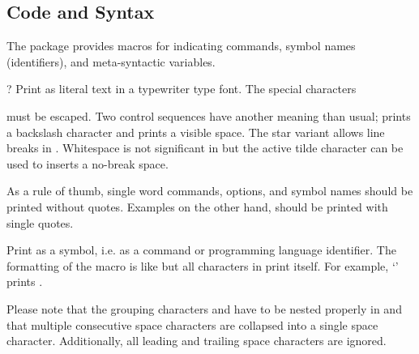 \documentclass{scrartcl}
\begin{document}
\subsection{Code and Syntax}

The  package provides macros for indicating
commands, symbol names (identifiers), and meta-syntactic variables.

\begin{definition}
 \code{*}\kleene? 
Print  as literal text in a typewriter type font.
The special characters
\begin{display}
\code{\\}\quad
\code{\{}\quad
\code{\}}\quad
\code{\#}\quad
\code{\$}\quad
\code{\%}\quad
\code{\&}\quad
\code{\^}\quad
\code{\_}\quad
\code{\~}
\end{display}
must be escaped.
\symindex{\\}
\texindexvisiblespace
Two control sequences have another meaning than usual; \code{\\\\}
prints a backslash character and \code{\\\ } prints a visible space.
The star variant allows line breaks in .  Whitespace is not
significant in  but the active tilde character can be used
to inserts a no-break space.

As a rule of thumb, single word commands, options, and symbol names
should be printed without quotes.  Examples on the other hand, should
be printed with single quotes.
\end{definition}

\begin{definition}
 
Print  as a symbol, i.e. as a command or programming
language identifier.  The formatting of the \symb{\symb} macro is like
\symb{\code} but all characters in  print itself.  For
example, ‘\code{\\symb\{\\symb\}}’ prints \symb{\symb}.

Please note that the grouping characters \code{\{} and \code{\}} have
to be nested properly in  and that multiple consecutive
space characters are collapsed into a single space character.
Additionally, all leading and trailing space characters are ignored.
\end{definition}
\end{document}

